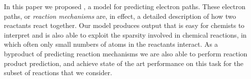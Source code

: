 
In this paper we proposed \ourModel, a model for predicting electron paths.
These electron paths, or {\em reaction mechanisms} are, in effect, a detailed description of how two reactants react together. 
Our model produces output that is easy for chemists to interpret and is also able to exploit the sparsity involved in chemical reactions, in which often only small numbers of atoms in the reactants interact.
As a byproduct of predicting reaction mechanisms we are also able to perform reaction product prediction,
 and achieve state of the art performance on this task for the subset of reactions that we consider.